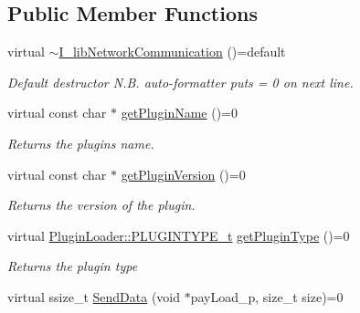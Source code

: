 \subsection*{Public Member Functions}
\begin{DoxyCompactItemize}
\item 
\mbox{\label{classlibNetworkCommunication_1_1I__libNetworkCommunication_a64d3699dcd86c2a55aeccd8c644076fb}} 
virtual \mbox{\hyperlink{classlibNetworkCommunication_1_1I__libNetworkCommunication_a64d3699dcd86c2a55aeccd8c644076fb}{$\sim$\+I\+\_\+lib\+Network\+Communication}} ()=default
\begin{DoxyCompactList}\small\item\em Default destructor N.\+B. auto-\/formatter puts \textquotesingle{}= 0\textquotesingle{} on next line. \end{DoxyCompactList}\item 
virtual const char $\ast$ \mbox{\hyperlink{classlibNetworkCommunication_1_1I__libNetworkCommunication_aa4a1a2180bdbf7b13ec0dd17f3cbb459}{get\+Plugin\+Name}} ()=0
\begin{DoxyCompactList}\small\item\em Returns the plugins name. \end{DoxyCompactList}\item 
virtual const char $\ast$ \mbox{\hyperlink{classlibNetworkCommunication_1_1I__libNetworkCommunication_a07a5da99fc896208065f34aa89453499}{get\+Plugin\+Version}} ()=0
\begin{DoxyCompactList}\small\item\em Returns the version of the plugin. \end{DoxyCompactList}\item 
virtual \mbox{\hyperlink{namespacePluginLoader_a7b1358e9577b47b5d4b16231a5a81699}{Plugin\+Loader\+::\+P\+L\+U\+G\+I\+N\+T\+Y\+P\+E\+\_\+t}} \mbox{\hyperlink{classlibNetworkCommunication_1_1I__libNetworkCommunication_a22412ea75e41d612c66c42b3c4dab1f3}{get\+Plugin\+Type}} ()=0
\begin{DoxyCompactList}\small\item\em Returns the plugin {\itshape type} \end{DoxyCompactList}\item 
virtual ssize\+\_\+t \mbox{\hyperlink{classlibNetworkCommunication_1_1I__libNetworkCommunication_add643ce010a3712f9097dc36f45bfd50}{Send\+Data}} (void $\ast$pay\+Load\+\_\+p, size\+\_\+t size)=0

\end{DoxyCompactItemize}

